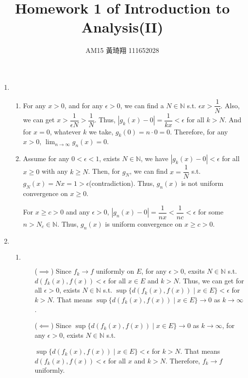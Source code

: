 \documentclass[12pt]{article}
\title{Homework 1 of Introduction to Analysis(II)}
\author{AM15 黃琦翔 111652028}
\begin{document}
\maketitle
\begin{enumerate}
    \item \begin{enumerate}
        \item For any $x > 0$, and for any $\epsilon > 0$, we can find a $N \in \mathbb{N}$ s.t. $\epsilon x > \dfrac{1}{N}$.
        Also, we can get $x > \dfrac{1}{\epsilon N} > \dfrac{1}{N}$.
        Thus, $|g_k(x) - 0| = \dfrac{1}{kx} < \epsilon$ for all $k > N$.
        And for $x = 0$, whatever $k$ we take, $g_k(0) = n \cdot 0 = 0$.
        Therefore, for any $x > 0$, $\displaystyle\lim_{n\to\infty} g_n(x) = 0$.

        \item Assume for any $0 < \epsilon < 1$, exists $N \in \mathbb{N}$,
        we have $|g_k(x) - 0| < \epsilon$ for all $x \geq 0$ with any $k \geq N$.
        Then, for $g_N$, we can find $x = \dfrac{1}{N}$ s.t. $g_N(x) = Nx = 1 > \epsilon$(contradiction).
        Thus, $g_n(x)$ is not uniform convergence on $x \geq 0$.

        For $x \geq c > 0$ and any $\epsilon > 0$, $|g_n(x) - 0| = \dfrac{1}{nx} < \dfrac{1}{nc} < \epsilon$ for some $n > N_c \in \mathbb{N}$.
        Thus, $g_n(x)$ is uniform convergence on $x \geq c > 0$.
    \end{enumerate}

    \item \begin{enumerate}
        \item $\ $ \begin{enumerate}
            \item[($\implies$)] Since $f_k \to f$ uniformly on $E$, for any $\epsilon > 0$, 
            exsits $N \in \mathbb{N}$ s.t. $d(f_k(x), f(x)) < \epsilon$ for all $x\in E$ and $k > N$.
            Thus, we can get for all $\epsilon > 0$, exists $N \in \mathbb{N}$ s.t. $\sup \{ d(f_k(x), f(x)) \mid x\in E\} < \epsilon$ for $k > N$.
            That means $\sup \{ d(f_k(x), f(x)) \mid x \in E\} \to 0$ as $k\to \infty$.
        
            \item[($\impliedby$)] Since $\sup \{ d(f_k(x), f(x)) \mid x\in E\} \to 0$ as $k \to \infty$, for any $\epsilon > 0$,
            exists $N \in \mathbb{N}$ s.t.
            
            $\sup \{ d(f_k(x), f(x)) \mid x \in E\} < \epsilon$ for $k > N$.
            That means $d(f_k(x), f(x)) < \epsilon$ for all $x$ and $k > N$.
            Therefore, $f_k \to f$ uniformly.
        \end{enumerate}
        \newpage


\end{enumerate}
\end{enumerate}
\end{document}
